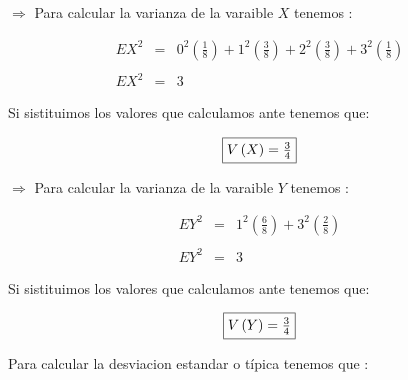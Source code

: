 \documentclass[12pt]{article}
\begin{document}
    \begin{flushleft}
        $\Rightarrow$ Para calcular la varianza de la varaible $X$ tenemos :
    \end{flushleft}

    \begin{equation*}
        \begin{array}{rcl}
            EX^2 & = &\displaystyle 0^2 \left(\frac{1}{8}\right) + 1^2 \left(\frac{3}{8}\right) + 2^2 \left(\frac{3}{8}\right) + 3^2 \left(\frac{1}{8}\right)
            \\
            \\
            EX^2 & = &3 
        \end{array}
    \end{equation*}

    \begin{flushleft}
        Si sistituimos los valores que calculamos ante tenemos que:  
    \end{flushleft}

    \begin{equation*}
        \fbox{$V\left(X\right) = \frac{3}{4}$}        
    \end{equation*}

    \begin{flushleft}
        $\Rightarrow$ Para calcular la varianza de la varaible $Y$ tenemos :
    \end{flushleft}

    \begin{equation*}
        \begin{array}{rcl}
            EY^2 & = & \displaystyle 1^2 \left(\frac{6}{8}\right) + 3^2 \left(\frac{2}{8}\right)
            \\
            \\
            EY^2 & = & 3
        \end{array}
    \end{equation*}

    \begin{flushleft}
        Si sistituimos los valores que calculamos ante tenemos que:  
    \end{flushleft}

    \begin{equation*}
        \fbox{$V\left(Y\right) = \frac{3}{4}$}        
    \end{equation*}

    \begin{flushleft}
        Para calcular la desviacion estandar o t\'ipica tenemos que : 
    \end{flushleft}
\end{document}
